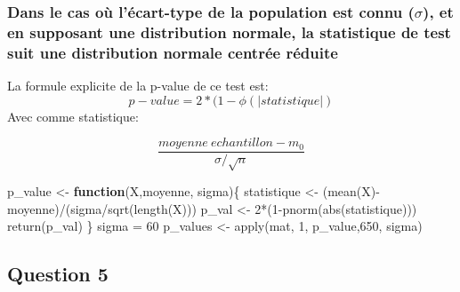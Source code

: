 \documentclass[
]{article}
\newenvironment{Shaded}{\begin{snugshade}}{\end{snugshade}}
\newcommand{\ControlFlowTok}[1]{\textcolor[rgb]{0.13,0.29,0.53}{\textbf{#1}}}
\newcommand{\DecValTok}[1]{\textcolor[rgb]{0.00,0.00,0.81}{#1}}
\newcommand{\FunctionTok}[1]{\textcolor[rgb]{0.00,0.00,0.00}{#1}}
\newcommand{\NormalTok}[1]{#1}
\newcommand{\OtherTok}[1]{\textcolor[rgb]{0.56,0.35,0.01}{#1}}
\newcommand{\SpecialCharTok}[1]{\textcolor[rgb]{0.00,0.00,0.00}{#1}}
\begin{document}
\hypertarget{dans-le-cas-ouxf9-luxe9cart-type-de-la-population-est-connu-sigma-et-en-supposant-une-distribution-normale-la-statistique-de-test-suit-une-distribution-normale-centruxe9e-ruxe9duite}{%
\subsubsection{\texorpdfstring{Dans le cas où l'écart-type de la
population est connu (\(\sigma\)), et en supposant une distribution
normale, la statistique de test suit une distribution normale centrée
réduite}{Dans le cas où l'écart-type de la population est connu (\textbackslash sigma), et en supposant une distribution normale, la statistique de test suit une distribution normale centrée réduite}}\label{dans-le-cas-ouxf9-luxe9cart-type-de-la-population-est-connu-sigma-et-en-supposant-une-distribution-normale-la-statistique-de-test-suit-une-distribution-normale-centruxe9e-ruxe9duite}}

La formule explicite de la p-value de ce test est:
\[p-value = 2*(1-\phi(|statistique|)\] Avec comme statistique:

\[\frac{moyenne\ echantillon -m_0}{\sigma/\sqrt{n}}\]

\begin{Shaded}
\begin{Highlighting}[]
\NormalTok{p\_value }\OtherTok{\textless{}{-}} \ControlFlowTok{function}\NormalTok{(X,moyenne, sigma)\{}
\NormalTok{  statistique }\OtherTok{\textless{}{-}}\NormalTok{ (}\FunctionTok{mean}\NormalTok{(X)}\SpecialCharTok{{-}}\NormalTok{moyenne)}\SpecialCharTok{/}\NormalTok{(sigma}\SpecialCharTok{/}\FunctionTok{sqrt}\NormalTok{(}\FunctionTok{length}\NormalTok{(X)))}
\NormalTok{  p\_val }\OtherTok{\textless{}{-}} \DecValTok{2}\SpecialCharTok{*}\NormalTok{(}\DecValTok{1}\SpecialCharTok{{-}}\FunctionTok{pnorm}\NormalTok{(}\FunctionTok{abs}\NormalTok{(statistique)))}
  \FunctionTok{return}\NormalTok{(p\_val)}
\NormalTok{\}}
\NormalTok{sigma }\OtherTok{=} \DecValTok{60}
\NormalTok{p\_values }\OtherTok{\textless{}{-}} \FunctionTok{apply}\NormalTok{(mat, }\DecValTok{1}\NormalTok{, p\_value,}\DecValTok{650}\NormalTok{, sigma)}
\end{Highlighting}
\end{Shaded}

\hypertarget{question-5}{%
\subsection{Question 5}\label{question-5}}
\end{document}
